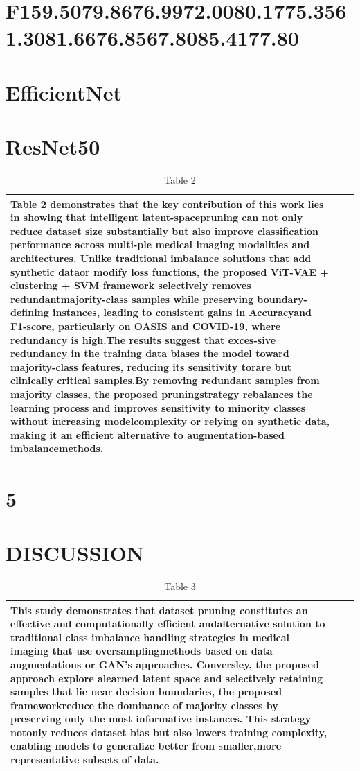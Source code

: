 \documentclass[final,5p,times,twocolumn,authoryear]{elsarticle}
\begin{document}
\section{F159.5079.8676.9972.0080.1775.3561.3081.6676.8567.8085.4177.80}
\section{EfficientNet}
\section{ResNet50}
\begin{table}[htbp]
\centering
\caption{Table 2}
\begin{tabular}{lll}
\hline
Table 2 demonstrates that the key contribution of this work lies in showing that intelligent latent-spacepruning can not only reduce dataset size substantially but also improve classification performance across multi-ple medical imaging modalities and architectures. Unlike traditional imbalance solutions that add synthetic dataor modify loss functions, the proposed ViT-VAE + clustering + SVM framework selectively removes redundantmajority-class samples while preserving boundary-defining instances, leading to consistent gains in Accuracyand F1-score, particularly on OASIS and COVID-19, where redundancy is high.The results suggest that exces-sive redundancy in the training data biases the model toward majority-class features, reducing its sensitivity torare but clinically critical samples.By removing redundant samples from majority classes, the proposed pruningstrategy rebalances the learning process and improves sensitivity to minority classes without increasing modelcomplexity or relying on synthetic data, making it an efficient alternative to augmentation-based imbalancemethods. & & \\
\hline
\end{tabular}
\end{table}
\section{5}
\section{DISCUSSION}
\begin{table}[htbp]
\centering
\caption{Table 3}
\begin{tabular}{lll}
\hline
This study demonstrates that dataset pruning constitutes an effective and computationally efficient andalternative solution to traditional class imbalance handling strategies in medical imaging that use oversamplingmethods based on data augmentations or GAN’s approaches. Conversley, the proposed approach explore alearned latent space and selectively retaining samples that lie near decision boundaries, the proposed frameworkreduce the dominance of majority classes by preserving only the most informative instances. This strategy notonly reduces dataset bias but also lowers training complexity, enabling models to generalize better from smaller,more representative subsets of data. & & \\
\hline
\end{tabular}
\end{table}
\end{document}
